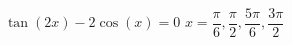 { $\tan (2x) - 2\cos(x) = 0$}
{ $x = \dfrac{\pi}{6}, \dfrac{\pi}{2}, \dfrac{5\pi}{6}, \dfrac{3\pi}{2}$}
